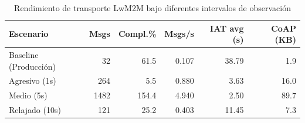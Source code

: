 
\begin{table}[htbp]
\centering
\caption{Rendimiento de transporte LwM2M bajo diferentes intervalos de observación}
\label{tab:lwm2m-benchmark}
\begin{tabular}{lrrrrr}
\toprule
\textbf{Escenario} & \textbf{Msgs} & \textbf{Compl.\%} & \textbf{Msgs/s} & \textbf{IAT avg (s)} & \textbf{CoAP (KB)} \\
\midrule
Baseline (Producción) & 32 & 61.5 & 0.107 & 38.79 & 1.9 \\
Agresivo (1s) & 264 & 5.5 & 0.880 & 3.63 & 16.0 \\
Medio (5s) & 1482 & 154.4 & 4.940 & 2.50 & 89.7 \\
Relajado (10s) & 121 & 25.2 & 0.403 & 11.45 & 7.3 \\
\bottomrule
\end{tabular}
\end{table}
